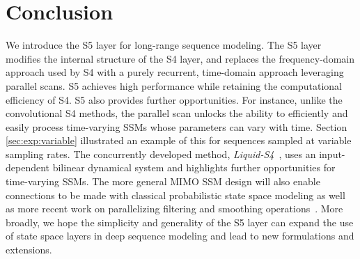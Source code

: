 \section{Conclusion}
\label{sec:conclusion}
We introduce the S5 layer for long-range sequence modeling.  The S5 layer modifies the internal structure of the S4 layer, and replaces the frequency-domain approach used by S4 with a purely recurrent, time-domain approach leveraging parallel scans. S5 achieves high performance while retaining the computational efficiency of S4.  S5 also provides further opportunities.  For instance, unlike the convolutional S4 methods, the parallel scan unlocks the ability to efficiently and easily process time-varying SSMs whose parameters can vary with time. Section \ref{sec:exp:variable} illustrated an example of this for sequences sampled at variable sampling rates. The concurrently developed method, \emph{Liquid-S4}~\citep{hasani2022liquid}, uses an input-dependent bilinear dynamical system and highlights further opportunities for time-varying SSMs. The more general MIMO SSM design will also enable connections to be made with classical probabilistic state space modeling as well as more recent work on parallelizing filtering and smoothing operations~\citep{sarkka2020temporal}.  More broadly, we hope the simplicity and generality of the S5 layer can expand the use of state space layers in deep sequence modeling and lead to new formulations and extensions.  


